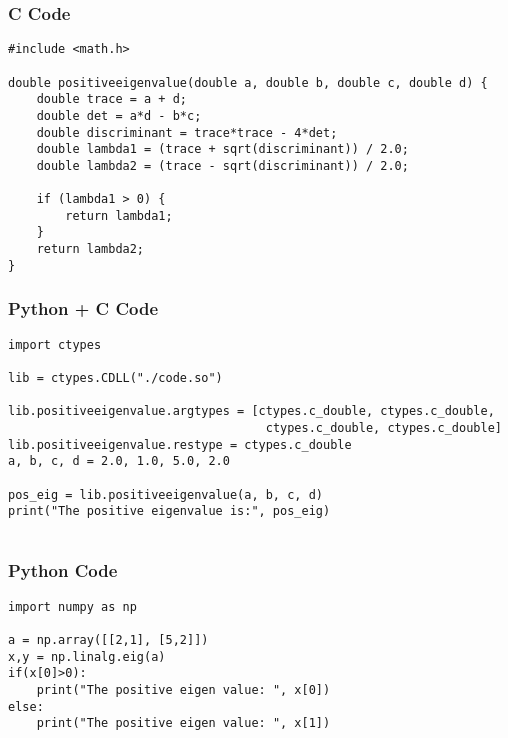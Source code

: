 \documentclass{beamer}
\begin{document}
\begin{frame}[fragile]
    \frametitle{C Code}
    \begin{lstlisting}
#include <math.h>

double positiveeigenvalue(double a, double b, double c, double d) {
    double trace = a + d;
    double det = a*d - b*c;
    double discriminant = trace*trace - 4*det;
    double lambda1 = (trace + sqrt(discriminant)) / 2.0;
    double lambda2 = (trace - sqrt(discriminant)) / 2.0;

    if (lambda1 > 0) {
        return lambda1;
    }
    return lambda2;
}
    \end{lstlisting}
\end{frame}
\begin{frame}[fragile]
    \frametitle{Python + C Code}
    \begin{lstlisting}
import ctypes

lib = ctypes.CDLL("./code.so")

lib.positiveeigenvalue.argtypes = [ctypes.c_double, ctypes.c_double,
                                    ctypes.c_double, ctypes.c_double]
lib.positiveeigenvalue.restype = ctypes.c_double
a, b, c, d = 2.0, 1.0, 5.0, 2.0

pos_eig = lib.positiveeigenvalue(a, b, c, d)
print("The positive eigenvalue is:", pos_eig)


    \end{lstlisting}
\end{frame}

\begin{frame}[fragile]
    \frametitle{Python Code}
    \begin{lstlisting}
import numpy as np

a = np.array([[2,1], [5,2]])
x,y = np.linalg.eig(a)
if(x[0]>0):
    print("The positive eigen value: ", x[0])
else:
    print("The positive eigen value: ", x[1])


    \end{lstlisting}
\end{frame}
\end{document}

